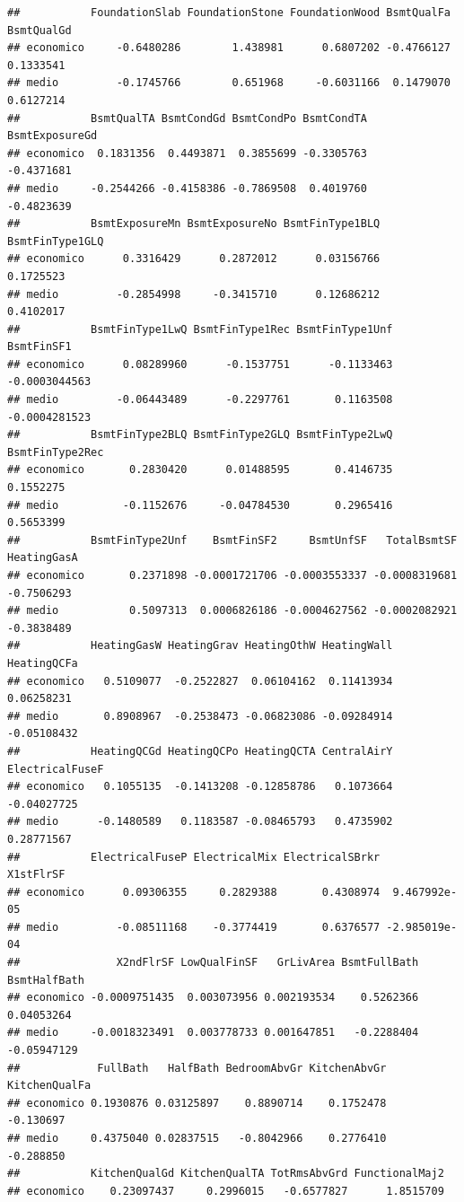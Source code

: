 \documentclass[
]{article}
\begin{document}
\begin{verbatim}
##           FoundationSlab FoundationStone FoundationWood BsmtQualFa BsmtQualGd
## economico     -0.6480286        1.438981      0.6807202 -0.4766127  0.1333541
## medio         -0.1745766        0.651968     -0.6031166  0.1479070  0.6127214
##           BsmtQualTA BsmtCondGd BsmtCondPo BsmtCondTA BsmtExposureGd
## economico  0.1831356  0.4493871  0.3855699 -0.3305763     -0.4371681
## medio     -0.2544266 -0.4158386 -0.7869508  0.4019760     -0.4823639
##           BsmtExposureMn BsmtExposureNo BsmtFinType1BLQ BsmtFinType1GLQ
## economico      0.3316429      0.2872012      0.03156766       0.1725523
## medio         -0.2854998     -0.3415710      0.12686212       0.4102017
##           BsmtFinType1LwQ BsmtFinType1Rec BsmtFinType1Unf    BsmtFinSF1
## economico      0.08289960      -0.1537751      -0.1133463 -0.0003044563
## medio         -0.06443489      -0.2297761       0.1163508 -0.0004281523
##           BsmtFinType2BLQ BsmtFinType2GLQ BsmtFinType2LwQ BsmtFinType2Rec
## economico       0.2830420      0.01488595       0.4146735       0.1552275
## medio          -0.1152676     -0.04784530       0.2965416       0.5653399
##           BsmtFinType2Unf    BsmtFinSF2     BsmtUnfSF   TotalBsmtSF HeatingGasA
## economico       0.2371898 -0.0001721706 -0.0003553337 -0.0008319681  -0.7506293
## medio           0.5097313  0.0006826186 -0.0004627562 -0.0002082921  -0.3838489
##           HeatingGasW HeatingGrav HeatingOthW HeatingWall HeatingQCFa
## economico   0.5109077  -0.2522827  0.06104162  0.11413934  0.06258231
## medio       0.8908967  -0.2538473 -0.06823086 -0.09284914 -0.05108432
##           HeatingQCGd HeatingQCPo HeatingQCTA CentralAirY ElectricalFuseF
## economico   0.1055135  -0.1413208 -0.12858786   0.1073664     -0.04027725
## medio      -0.1480589   0.1183587 -0.08465793   0.4735902      0.28771567
##           ElectricalFuseP ElectricalMix ElectricalSBrkr     X1stFlrSF
## economico      0.09306355     0.2829388       0.4308974  9.467992e-05
## medio         -0.08511168    -0.3774419       0.6376577 -2.985019e-04
##               X2ndFlrSF LowQualFinSF   GrLivArea BsmtFullBath BsmtHalfBath
## economico -0.0009751435  0.003073956 0.002193534    0.5262366   0.04053264
## medio     -0.0018323491  0.003778733 0.001647851   -0.2288404  -0.05947129
##            FullBath   HalfBath BedroomAbvGr KitchenAbvGr KitchenQualFa
## economico 0.1930876 0.03125897    0.8890714    0.1752478     -0.130697
## medio     0.4375040 0.02837515   -0.8042966    0.2776410     -0.288850
##           KitchenQualGd KitchenQualTA TotRmsAbvGrd FunctionalMaj2
## economico    0.23097437     0.2996015   -0.6577827      1.8515709

\end{verbatim}
\end{document}
